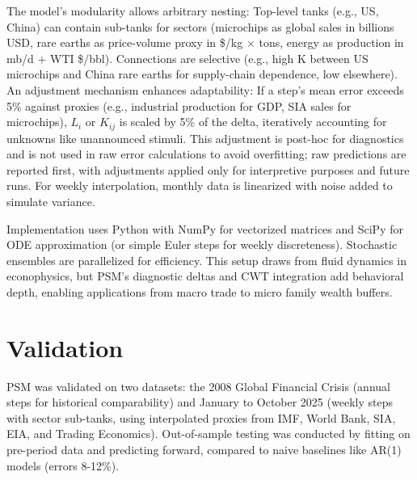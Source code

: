 \documentclass[11pt]{article}
\begin{document}
The model's modularity allows arbitrary nesting: Top-level tanks (e.g., US, China) can contain sub-tanks for sectors (microchips as global sales in billions USD, rare earths as price-volume proxy in \$/kg $\times$ tons, energy as production in mb/d + WTI \$/bbl). Connections are selective (e.g., high K between US microchips and China rare earths for supply-chain dependence, low elsewhere). An adjustment mechanism enhances adaptability: If a step's mean error exceeds 5\% against proxies (e.g., industrial production for GDP, SIA sales for microchips), $L_i$ or $K_{ij}$ is scaled by 5\% of the delta, iteratively accounting for unknowns like unannounced stimuli. This adjustment is post-hoc for diagnostics and is not used in raw error calculations to avoid overfitting; raw predictions are reported first, with adjustments applied only for interpretive purposes and future runs. For weekly interpolation, monthly data is linearized with noise added to simulate variance.

Implementation uses Python with NumPy for vectorized matrices and SciPy for ODE approximation (or simple Euler steps for weekly discreteness). Stochastic ensembles are parallelized for efficiency. This setup draws from fluid dynamics in econophysics, but PSM's diagnostic deltas and CWT integration add behavioral depth, enabling applications from macro trade to micro family wealth buffers.

\section{Validation}
PSM was validated on two datasets: the 2008 Global Financial Crisis (annual steps for historical comparability) and January to October 2025 (weekly steps with sector sub-tanks, using interpolated proxies from IMF, World Bank, SIA, EIA, and Trading Economics). Out-of-sample testing was conducted by fitting on pre-period data and predicting forward, compared to naive baselines like AR(1) models (errors 8-12\%).
\end{document}
